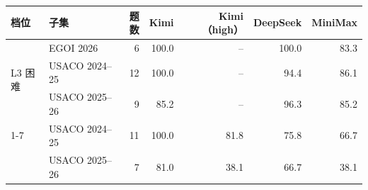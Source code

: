 \begin{tabular}{@{}llrrrrr@{}}
\toprule
档位 & 子集 & 题数 & Kimi & Kimi（high） & DeepSeek & MiniMax \\
\midrule
\multirow{3}{*}{L3 困难} & EGOI 2026 & 6 & 100.0 & -- & 100.0 & 83.3 \\
 & USACO 2024--25 & 12 & 100.0 & -- & 94.4 & 86.1 \\
 & USACO 2025--26 & 9 & 85.2 & -- & 96.3 & 85.2 \\
\cmidrule(lr){1-7}
\multirow{2}{*}{L4 顶尖} & USACO 2024--25 & 11 & 100.0 & 81.8 & 75.8 & 66.7 \\
 & USACO 2025--26 & 7 & 81.0 & 38.1 & 66.7 & 38.1 \\
\bottomrule
\end{tabular}
